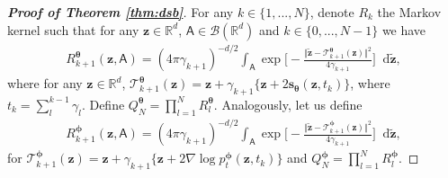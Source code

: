 \documentclass{article}
\theoremstyle{definition}
\theoremstyle{remark}
\newcommand*\diff{\mathop{}\!\mathrm{d}}
\begin{document}
	\begin{proof}[\textbf{Proof of Theorem \ref{thm:dsb}}]
		For any $k\in\{1,...,N\}$, denote $R_{k}$ the Markov kernel such that for any $\mathbf{z}\in\mathbb{R}^{d}$, $\mathsf{A}\in\mathcal{B}(\mathbb{R}^{d})$ and $k\in\{0,...,N-1\}$ we have
		\begin{align*}
		R_{k+1}^{\bm{\theta}}(\mathbf{z},\mathsf{A})=(4\pi\gamma_{k+1})^{-d/2}\int_{\mathsf{A}}\exp{\bigg[-\frac{\Vert\mathbf{\tilde{z}}-\mathcal{T}_{k+1}^{\bm{\theta}}(\mathbf{z})\Vert^{2}}{4\gamma_{k+1}}\bigg]}\diff\mathbf{\tilde{z}},
		\end{align*}
		where for any $\mathbf{z}\in\mathbb{R}^{d}$, $\mathcal{T}_{k+1}^{\bm{\theta}}(\mathbf{z})=\mathbf{z}+\gamma_{k+1}\{\mathbf{z}+2\mathbf{s}_{\bm{\theta}}(\mathbf{z},t_{k})\}$, where $t_{k}=\sum_{l}^{k-1}\gamma_{l}$. Define $Q_{N}^{\bm{\theta}}=\prod_{l=1}^{N}R_{l}^{\bm{\theta}}$. Analogously, let us define
		\begin{align*}
		R_{k+1}^{\bm{\phi}}(\mathbf{z},\mathsf{A})=(4\pi\gamma_{k+1})^{-d/2}\int_{\mathsf{A}}\exp{\bigg[-\frac{\Vert\mathbf{\tilde{z}}-\mathcal{T}_{k+1}^{\bm{\phi}}(\mathbf{z})\Vert^{2}}{4\gamma_{k+1}}\bigg]}\diff\mathbf{\tilde{z}},
		\end{align*}
		for $\mathcal{T}_{k+1}^{\bm{\phi}}(\mathbf{z})=\mathbf{z}+\gamma_{k+1}\{\mathbf{z}+2\nabla\log{p_{t}^{\bm{\phi}}(\mathbf{z},t_{k})}\}$ and $Q_{N}^{\bm{\phi}}=\prod_{l=1}^{N}R_{l}^{\bm{\phi}}$.
		

\end{proof}
\end{document}
